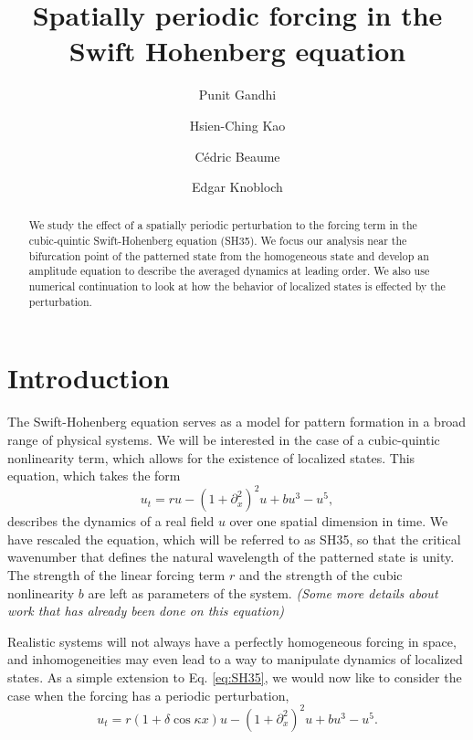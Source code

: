 \documentclass[api,pof,pre,12pt,a4paper]{revtex4-1}
\begin{document}

\title{Spatially periodic forcing in the Swift Hohenberg equation}

\author{Punit Gandhi}
\author{Hsien-Ching Kao}
\author{C\'edric Beaume}
\author{Edgar Knobloch}

\begin{abstract}
We study the effect of a spatially periodic perturbation to the forcing term in the cubic-quintic Swift-Hohenberg equation (SH35).  We focus our analysis near the bifurcation point of the patterned state from the homogeneous state and develop an amplitude equation to describe the averaged dynamics at leading order.  We also use numerical continuation to look at how the behavior of localized states is effected by the perturbation.
\end{abstract}

\maketitle

\section{Introduction}
The Swift-Hohenberg equation serves as a model for pattern formation in a broad range of physical systems.  We will be interested in the case of a cubic-quintic nonlinearity term, which allows for the existence of localized states.  This equation, which takes the form  
\begin{equation}
u_t= r u-\left(1+\partial_{x}^2\right)^2u+bu^3-u^5\label{eq:SH35},
\end{equation}
describes the dynamics of a real field $u$ over one spatial dimension in time.  We have rescaled the equation, which will be referred to as SH35, so that the critical wavenumber that defines the natural wavelength of the patterned state is unity. The strength of the linear forcing term $r$ and the strength of the cubic nonlinearity $b$ are left as parameters of the system.  {\it (Some more details about work that has already been done on this equation)} 


Realistic systems will not always have a perfectly homogeneous forcing in space, and inhomogeneities may even lead to a way to manipulate dynamics of localized states. As a simple extension to Eq. \ref{eq:SH35}, we would now like to consider the case when the forcing has a periodic perturbation,
\begin{equation}
u_t= r(1+\delta \cos{\kappa x}) u -\left(1+\partial_{x}^2\right)^2u+bu^3-u^5\label{eq:SH35spf}.
\end{equation}
\end{document}
